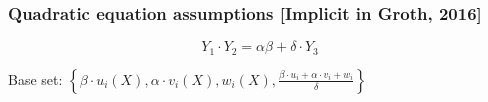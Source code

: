 \documentclass[shadesubsections,trans,14pt,mathserif]{beamer}
\newcommand{\set}[1]{\ensuremath{\left\{#1\right\}}}
\begin{document}
%  
%  
% 
%  
%  
% 
 
 
 
 \begin{frame}
 \frametitle{Quadratic equation assumptions [Implicit in Groth, 2016]}
 
 
 \[Y_1\cdot Y_2= \alpha\beta + \delta \cdot Y_{3}\]
  \vspace{0.3in}
 
 
 Base set: $\set{\beta\cdot u_i(X),\alpha\cdot v_i(X), w_i(X),
 \frac{\beta \cdot u_i+\alpha\cdot v_i+w_i}{\delta}}$
  \vspace{0.3in}
 
 
 \end{frame}

 
 
\end{document}

